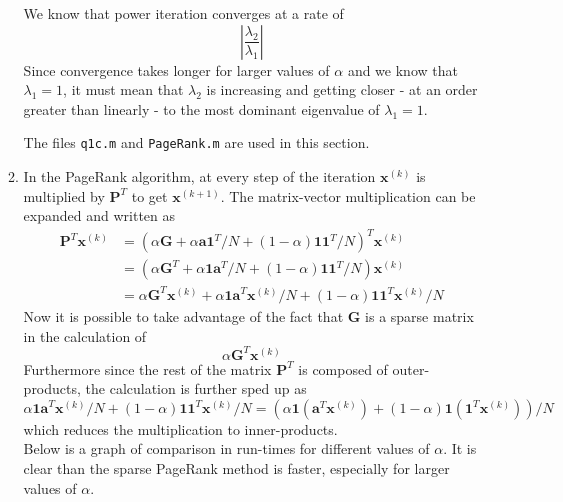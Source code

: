\documentclass{article}
\begin{document}
\begin{enumerate}
\begin{enumerate}
			We know that power iteration converges at a rate of 
			$$
				|\frac{\lambda_2}{\lambda_1}|
			$$
			Since convergence takes longer for larger values of $\alpha$ and we know that $\lambda_1 = 1$, it must mean that $\lambda_2$ is increasing and getting closer - at an order greater than linearly - to the most dominant eigenvalue of $\lambda_1 = 1$.
			
			The files \texttt{q1c.m} and \texttt{PageRank.m} are used in this section.
		\item In the PageRank algorithm, at every step of the iteration $\textbf{x}^{(k)}$ is multiplied by $\textbf{P}^T$ to get $\textbf{x}^{(k+1)}$. The matrix-vector multiplication can be expanded and written as 
			\begin{equation*}
			\begin{split}
				\textbf{P}^T \textbf{x}^{(k)} 
				& = (\alpha \textbf{G} + \alpha \textbf{a1}^T/N + (1-\alpha) \textbf{11}^T /N )^T \textbf{x}^{(k)} \\
				& = (\alpha \textbf{G}^T + \alpha \textbf{1a}^T/N + (1-\alpha) \textbf{11}^T /N ) \textbf{x}^{(k)} \\
				& = \alpha \textbf{G}^T \textbf{x}^{(k)} + \alpha \textbf{1a}^T\textbf{x}^{(k)}/N + (1-\alpha) \textbf{11}^T \textbf{x}^{(k)} /N
			\end{split}
			\end{equation*}
			 Now it is possible to take advantage of the fact that $\textbf{G}$ is a sparse matrix in the calculation of 
			$$
				\alpha \textbf{G}^T \textbf{x}^{(k)}
			$$
			Furthermore since the rest of the matrix $\textbf{P}^T$ is composed of outer-products, the calculation is further sped up as
			$$
				\alpha \textbf{1a}^T\textbf{x}^{(k)}/N + (1-\alpha) \textbf{11}^T \textbf{x}^{(k)} /N 
				= (\alpha \textbf{1}(\textbf{a}^T\textbf{x}^{(k)}) + (1-\alpha) \textbf{1}(\textbf{1}^T \textbf{x}^{(k)}) )/N
			$$
			which reduces the multiplication to inner-products. \\
			Below is a graph of comparison in run-times for different values of $\alpha$. It is clear than the sparse PageRank method is faster, especially for larger values of $\alpha$.
			

\end{enumerate}
\end{enumerate}
\end{document}
